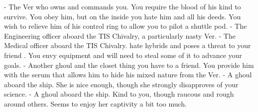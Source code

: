 \documentclass[char]{guildcamp4}
\begin{document}
\begin{itemz}[Notes]
	\item 
\end{itemz}

\begin{contacts}
	\contact{\cVone{}} - The Ver who owns and commands you. You require the blood of his kind to survive. You obey him, but on the inside you hate him and all his deeds. You wish to relieve him of his control ring to allow you to pilot a shuttle pod.
	\contact{\cVtwo{}} - The Engineering officer aboard the TIS Chivalry, a particularly nasty Ver.
	\contact{\cVthree{}} - The Medical officer aboard the TIS Chivalry. \cVthree{\They} hate hybrids and poses a threat to your friend \cRasputin{}. You envy \cVthree{\their} equipment and will need to steal some of it to advance your goals.
	\contact{\cRasputin{}} - Another ghoul and the closet thing you have to a friend. You provide him with the serum that allows him to hide his mixed nature from the Ver. 
	\contact{\cJoan{}} - A ghoul aboard the ship. She is nice enough, though she strongly disapproves of your science.  
	\contact{\cJulie{}} - A ghoul aboard the ship. Kind to you, though raucous and rough around others. Seems to enjoy her captivity a bit too much. 
\end{contacts}
\end{document}
